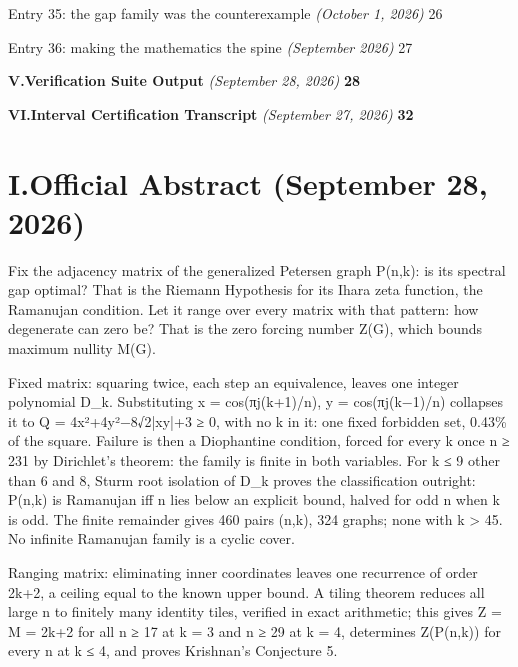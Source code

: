 \documentclass[11pt]{article}
\begin{document}
\quad\footnotesize \textcolor{toclink}{Entry 35: the gap family was the counterexample} \emph{(October 1, 2026)} \dotfill \textcolor{toclink}{26}\par
\quad\footnotesize \textcolor{toclink}{Entry 36: making the mathematics the spine} \emph{(September 2026)} \dotfill \textcolor{toclink}{27}\par
\vspace{0.6em}
\par\noindent\textbf{\large V.\quad \textcolor{toclink}{Verification Suite Output}} \emph{(September 28, 2026)} \dotfill \textbf{\textcolor{toclink}{28}}\par\vspace{0.35em}
\par\noindent\textbf{\large VI.\quad \textcolor{toclink}{Interval Certification Transcript}} \emph{(September 27, 2026)} \dotfill \textbf{\textcolor{toclink}{32}}\par
\newpage
\hypertarget{sec:abstract}{\section*{I.\quad Official Abstract \hfill\normalsize\normalfont(September 28, 2026)}}


Fix the adjacency matrix of the generalized Petersen graph P(n,k): is its spectral gap optimal? That is the Riemann Hypothesis for its Ihara zeta function, the Ramanujan condition. Let it range over every matrix with that pattern: how degenerate can zero be? That is the zero forcing number Z(G), which bounds maximum nullity M(G).

Fixed matrix: squaring twice, each step an equivalence, leaves one integer polynomial D\_k. Substituting x = cos(πj(k+1)/n), y = cos(πj(k−1)/n) collapses it to Q = 4x²+4y²−8√2|xy|+3 ≥ 0, with no k in it: one fixed forbidden set, 0.43\% of the square. Failure is then a Diophantine condition, forced for every k once n ≥ 231 by Dirichlet's theorem: the family is finite in both variables. For k ≤ 9 other than 6 and 8, Sturm root isolation of D\_k proves the classification outright: P(n,k) is Ramanujan iff n lies below an explicit bound, halved for odd n when k is odd. The finite remainder gives 460 pairs (n,k), 324 graphs; none with k > 45. No infinite Ramanujan family is a cyclic cover.

Ranging matrix: eliminating inner coordinates leaves one recurrence of order 2k+2, a ceiling equal to the known upper bound. A tiling theorem reduces all large n to finitely many identity tiles, verified in exact arithmetic; this gives Z = M = 2k+2 for all n ≥ 17 at k = 3 and n ≥ 29 at k = 4, determines Z(P(n,k)) for every n at k ≤ 4, and proves Krishnan's Conjecture 5.
\end{document}
